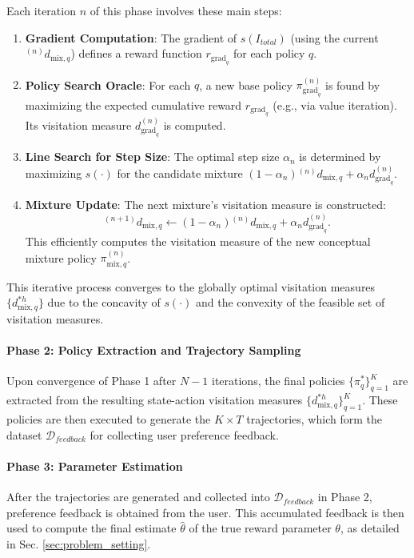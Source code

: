 \documentclass{article}
\begin{document}
Each iteration $n$ of this phase involves these main steps:
\begin{enumerate}
    \item \textbf{Gradient Computation}: The gradient of $s(I_{total})$ (using the current ${}^{(n)}d_{\text{mix},q}$) defines a reward function $r_{\text{grad}_q}$ for each policy $q$.
    \item \textbf{Policy Search Oracle}: For each $q$, a new base policy $\pi_{\text{grad}_q}^{(n)}$ is found by maximizing the expected cumulative reward $r_{\text{grad}_q}$ (e.g., via value iteration). Its visitation measure $d_{\text{grad}_q}^{(n)}$ is computed.
    \item \textbf{Line Search for Step Size}: The optimal step size $\alpha_n$ is determined by maximizing $s(\cdot)$ for the candidate mixture $(1-\alpha_n){}^{(n)}d_{\text{mix},q} + \alpha_n d_{\text{grad}_q}^{(n)}$.
    \item \textbf{Mixture Update}: The next mixture's visitation measure is constructed:
    \[
    {}^{(n+1)}d_{\text{mix},q} \leftarrow (1-\alpha_n) {}^{(n)}d_{\text{mix},q} + \alpha_n d_{\text{grad}_q}^{(n)}.
    \]
    This efficiently computes the visitation measure of the new conceptual mixture policy $\pi_{\text{mix},q}^{(n)}$.
\end{enumerate}
This iterative process converges to the globally optimal visitation measures $\{d^{*h}_{\text{mix},q}\}$ due to the concavity of $s(\cdot)$ and the convexity of the feasible set of visitation measures.

\paragraph{Phase 2: Policy Extraction and Trajectory Sampling} Upon convergence of Phase 1 after $N-1$ iterations, the final policies $\{\pi^*_q\}_{q=1}^K$ are extracted from the resulting state-action visitation measures $\{ d^{*h}_{\text{mix},q} \}_{q=1}^K$. These policies are then executed to generate the $K \times T$ trajectories, which form the dataset $\mathcal{D}_{feedback}$ for collecting user preference feedback.

\paragraph{Phase 3: Parameter Estimation} After the trajectories are generated and collected into $\mathcal{D}_{feedback}$ in Phase 2, preference feedback is obtained from the user. This accumulated feedback is then used to compute the final estimate $\hat{\theta}$ of the true reward parameter $\theta$, as detailed in Sec. \ref{sec:problem_setting}.
\end{document}
